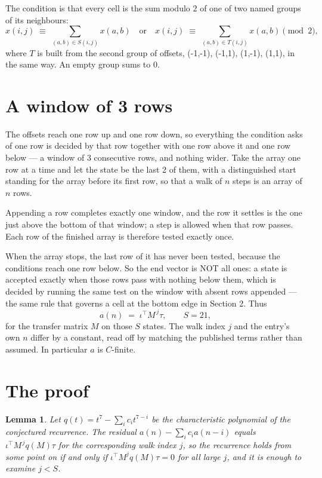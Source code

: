 \documentclass[11pt,a4paper]{article}
\theoremstyle{plain}
\newtheorem{lemma}[theorem]{Lemma}
\theoremstyle{definition}
\begin{document}
The condition is that every cell is the sum modulo $2$ of one of two named groups of its neighbours:
\[
x(i,j)\;\equiv\;\sum_{(a,b)\in S(i,j)}x(a,b) \quad\text{or}\quad x(i,j)\;\equiv\;\sum_{(a,b)\in T(i,j)}x(a,b) \pmod{2},
\]
where $T$ is built from the second group of offsets, (-1,-1), (-1,1), (1,-1), (1,1), in the same way. An empty group sums to $0$.

\section{A window of 3 rows}

The offsets reach one row up and one row down, so everything the condition asks of one row is
decided by that row together with one row above it and one row below --- a window of
$3$ consecutive rows, and nothing wider. Take the array one row at a time
and let the state be the last 2 of them, with a distinguished start standing for the
array before its first row, so that a walk of $n$ steps is an array of $n$ rows.

Appending a row completes exactly one window, and the row it settles is the one just above the bottom of that window; a step is
allowed when that row passes. Each row of the finished
array is therefore tested exactly once.

When the array stops, the last row of it has never been tested, because the
conditions reach one row below. So the end vector is NOT all ones: a state is accepted exactly when
those rows pass with nothing below them, which is decided by running the same test on the window
with absent rows appended --- the same rule that governs a cell at the bottom edge in
Section 2.
Thus
\[
a(n)\;=\;\iota^{\!\top}M^{\,j}\tau ,\qquad S=21,
\]
for the transfer matrix $M$ on those $S$ states. The walk index $j$ and the entry's own $n$
differ by a constant, read off by matching the published terms rather than assumed. In
particular $a$ is $C$-finite.

\section{The proof}

\begin{lemma}\label{lem:crit}
Let $q(t)=t^{7}-\sum_i c_it^{7-i}$ be the characteristic polynomial of the
conjectured recurrence. The residual $a(n)-\sum_ic_ia(n-i)$ equals
$\iota^{\!\top}M^{\,j}q(M)\tau$ for the corresponding walk index $j$, so the recurrence
holds from some point on if and only if $\iota^{\!\top}M^{j}q(M)\tau=0$ for all large $j$,
and it is enough to examine $j<S$.
\end{lemma}
\end{document}
